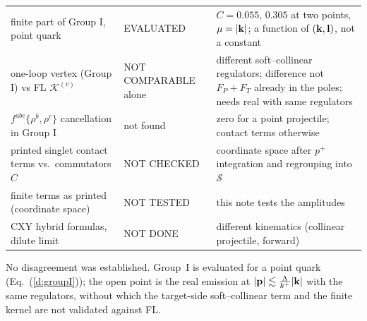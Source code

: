 \begin{center}
\begin{tabular}{|p{}|p{}|p{}|}
finite part of Group I, point quark & EVALUATED & $C=0.055$, $0.305$ at two points, $\mu=|\mathbf{k}|$; a function of $(\mathbf{k},\mathbf{l})$, not a constant\\
one-loop vertex (Group I) vs FL $\mathcal K^{(v)}$ & NOT COMPARABLE alone & different soft--collinear regulators; difference not $F_P+F_T$ already in the poles; needs real with same regulators\\
$f^{abc}\{\rho^b,\rho^c\}$ cancellation in Group I & not found & zero for a point projectile; contact terms otherwise\\
printed singlet contact terms vs.\ commutators $C$ & NOT CHECKED & coordinate space after $p^+$ integration and regrouping into $\mathcal S$\\
finite terms as printed (coordinate space) & NOT TESTED & this note tests the amplitudes\\
CXY hybrid formulas, dilute limit & NOT DONE & different kinematics (collinear projectile, forward)\\\hline
\end{tabular}
\end{center}
No disagreement was established. Group~I is evaluated for a point quark (Eq.~(\ref{d:groupI})); the open point is the real emission at $|\mathbf{p}|\lesssim\frac{\Lambda}{k^+}|\mathbf{k}|$ with the same regulators, without which the target-side soft--collinear term and the finite kernel are not validated against FL.

